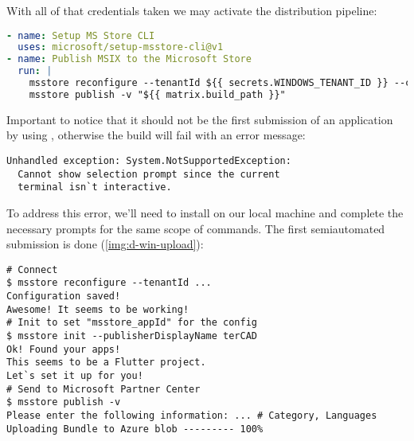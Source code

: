 
\noindent With all of that credentials taken we may activate the distribution pipeline:

\begin{lstlisting}[language=yaml]
- name: Setup MS Store CLI
  uses: microsoft/setup-msstore-cli@v1
- name: Publish MSIX to the Microsoft Store
  run: |
    msstore reconfigure --tenantId ${{ secrets.WINDOWS_TENANT_ID }} --clientId ${{ secrets.WINDOWS_CLIENT_ID }} --clientSecret ${{ secrets.WINDOWS_SECRET }} --sellerId ${{ secrets.WINDOWS_SELLER_ID }}
    msstore publish -v "${{ matrix.build_path }}"
\end{lstlisting}

\noindent Important to notice that it should not be the first submission of an application by using , 
otherwise the build will fail with an error message:

\begin{lstlisting}[language=terminal]
Unhandled exception: System.NotSupportedException: 
  Cannot show selection prompt since the current 
  terminal isn`t interactive.
\end{lstlisting}

\noindent To address this error, we'll need to install  on our local machine and complete the necessary 
prompts for the same scope of commands. The first semiautomated submission is done (\cref{img:d-win-upload}):

\begin{lstlisting}[language=terminal]
# Connect
$ msstore reconfigure --tenantId ...
Configuration saved!
Awesome! It seems to be working!
# Init to set "msstore_appId" for the config
$ msstore init --publisherDisplayName terCAD
Ok! Found your apps!                    
This seems to be a Flutter project.
Let`s set it up for you!
# Send to Microsoft Partner Center
$ msstore publish -v
Please enter the following information: ... # Category, Languages
Uploading Bundle to Azure blob --------- 100%
\end{lstlisting}


